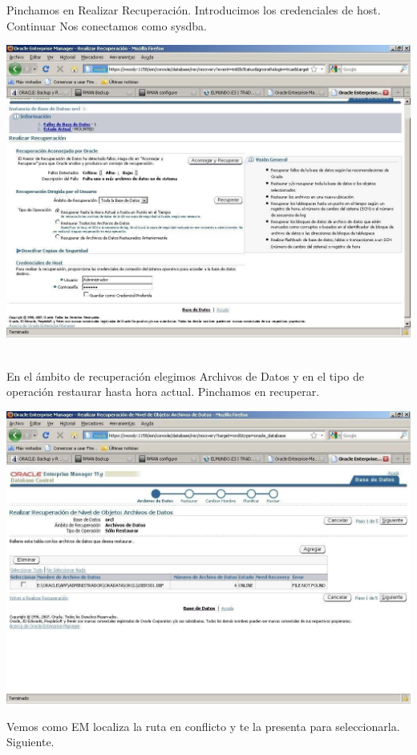 \begin{enumerate}[1.]
\begin{center}
	\end{center}
	Pinchamos en Realizar Recuperación. Introducimos los credenciales de host. Continuar Nos conectamos como sysdba.
	\begin{center}
	\includegraphics[width=15cm]{./Imagenes/recu_3}  
	\end{center}
	\\En el ámbito de recuperación elegimos Archivos de Datos y en el tipo de operación restaurar hasta hora actual. Pinchamos en recuperar.
	\begin{center}
	\includegraphics[width=15cm]{./Imagenes/recu_4}  
	\end{center}	
	Vemos  como  EM  localiza  la  ruta  en  conflicto  y  te  la  presenta  para  seleccionarla. Siguiente.
	\begin{center}

\end{center}
\end{enumerate}
